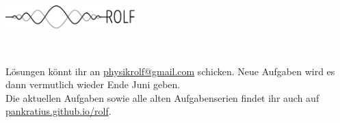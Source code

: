 \documentclass[a4paper]{article}
\begin{document}
	\vspace*{-1cm}
	\parbox{4cm}{\vspace{-0.2cm}\includegraphics[width=5cm]{../images/logo_scaled.pdf}}
	\parbox{10.6cm}{ \\
			\vspace*{0.3cm} }
		\vspace{0.5cm}

\thispagestyle{empty}
\begin{framed}
	\noindent
	\scriptsize
	 Lösungen könnt ihr an \href{mailto:physikrolf@gmail.com}{physikrolf@gmail.com} schicken.
	 Neue Aufgaben wird es dann vermutlich wieder Ende Juni geben.
	 \\ Die aktuellen Aufgaben sowie alle alten Aufgabenserien findet ihr auch auf \url{pankratius.github.io/rolf}.
\end{framed}

\noindent



 
\end{document}
